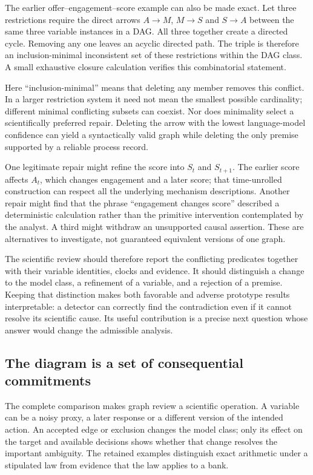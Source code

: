 The earlier offer--engagement--score example can also be made exact. Let
three restrictions require the direct arrows \(A\to M\), \(M\to S\) and
\(S\to A\) between the same three variable instances in a DAG. All three
together create a directed cycle. Removing any one leaves an acyclic
directed path. The triple is therefore an inclusion-minimal inconsistent
set of these restrictions within the DAG class. A small exhaustive
closure calculation verifies this combinatorial statement.
\citep{exec13_diagram_restrictions}

Here ``inclusion-minimal'' means that deleting any member removes this
conflict. In a larger restriction system it need not mean the smallest
possible cardinality; different minimal conflicting subsets can coexist.
Nor does minimality select a scientifically preferred repair. Deleting
the arrow with the lowest language-model confidence can yield a
syntactically valid graph while deleting the only premise supported by a
reliable process record.

One legitimate repair might refine the score into \(S_t\) and
\(S_{t+1}\). The earlier score affects \(A_t\), which changes engagement
and a later score; that time-unrolled construction can respect all the
underlying mechanism descriptions. Another repair might find that the
phrase ``engagement changes score'' described a deterministic
calculation rather than the primitive intervention contemplated by the
analyst. A third might withdraw an unsupported causal assertion. These
are alternatives to investigate, not guaranteed equivalent versions of
one graph.

The scientific review should therefore report the conflicting predicates
together with their variable identities, clocks and evidence. It should
distinguish a change to the model class, a refinement of a variable, and
a rejection of a premise. Keeping that distinction makes both favorable
and adverse prototype results interpretable: a detector can correctly
find the contradiction even if it cannot resolve its scientific cause.
Its useful contribution is a precise next question whose answer would
change the admissible analysis.

\subsection{The diagram is a set of consequential commitments}

The complete comparison makes graph review a scientific operation. A variable
can be a noisy proxy, a later response or a different version of the intended
action. An accepted edge or exclusion changes the model class; only its effect
on the target and available decisions shows whether that change resolves the
important ambiguity. The retained examples distinguish exact arithmetic under
a stipulated law from evidence that the law applies to a bank.

